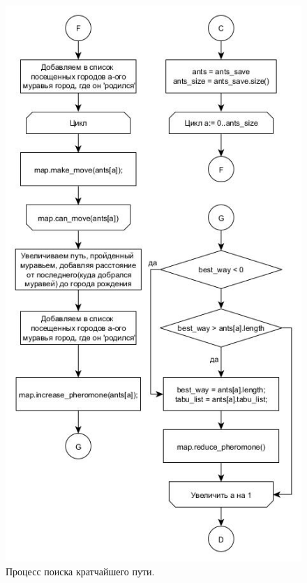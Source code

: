 \documentclass[a4paper, 14pt]{article}
\begin{document}
\begin{figure}[h!]
\center
\includegraphics[scale=0.6]{run_3_cd.jpg}
\caption{Процесс поиска кратчайшего пути.}
\label{ris:run_3}
\end{figure}\newpage
\end{document}
